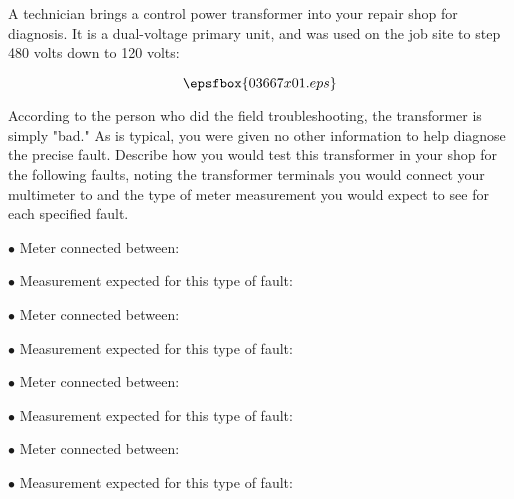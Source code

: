 

A technician brings a control power transformer into your repair shop for diagnosis.  It is a dual-voltage primary unit, and was used on the job site to step 480 volts down to 120 volts:

$$\epsfbox{03667x01.eps}$$

According to the person who did the field troubleshooting, the transformer is simply "bad."  As is typical, you were given no other information to help diagnose the precise fault.  Describe how you would test this transformer in your shop for the following faults, noting the transformer terminals you would connect your multimeter to and the type of meter measurement you would expect to see for each specified fault.

\vskip 10pt

\noindent
{}

\vskip 5pt
\item{$\bullet$} Meter connected between:
\vskip 5pt
\item{$\bullet$} Measurement expected for this type of fault:

\vskip 30pt

\noindent
{}

\vskip 5pt
\item{$\bullet$} Meter connected between:
\vskip 5pt
\item{$\bullet$} Measurement expected for this type of fault:

\vskip 30pt

\noindent
{}

\vskip 5pt
\item{$\bullet$} Meter connected between:
\vskip 5pt
\item{$\bullet$} Measurement expected for this type of fault:

\vskip 30pt

\noindent
{}

\vskip 5pt
\item{$\bullet$} Meter connected between:
\vskip 5pt
\item{$\bullet$} Measurement expected for this type of fault:

